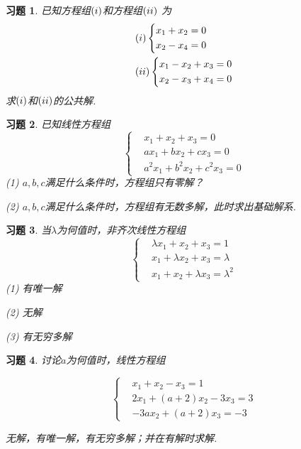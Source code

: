 \documentclass[a4paper]{book}
\newtheorem{ex}{习题}[chapter]
\begin{document}
\begin{ex}\label{5.16}
已知方程组$(\romannumeral 1)$和方程组$(\romannumeral 2)$ 为
\begin{displaymath}\begin{aligned}&
(\romannumeral 1)\left\{ \begin{aligned}&x_1+x_2=0\\&x_2-x_4=0\end{aligned}\right.\\ &
(\romannumeral 2)\left\{ \begin{aligned}&x_1-x_2+x_3=0\\&x_2-x_3+x_4=0\end{aligned}\right.\end{aligned}
\end{displaymath}
求$(\romannumeral 1)$和$(\romannumeral 2)$的公共解.
\end{ex}

\begin{ex}\label{5.17}
已知线性方程组
\begin{displaymath}\left\{\begin{aligned}&x_1+ x_2+ x_3=0\\&ax_1+bx_2+cx_3=0\\&a^2 x_1+b^2 x_2+c^2 x_3=0\end{aligned}\right.\end{displaymath}
(1) $a,b,c$满足什么条件时，方程组只有零解？

(2)  $a,b,c$满足什么条件时，方程组有无数多解，此时求出基础解系.
\end{ex}

\begin{ex}\label{5.18}
当$\lambda$为何值时，非齐次线性方程组
\begin{displaymath}\left\{\begin{aligned}&
\lambda x_1+ x_2+ x_3=1\\& x_1+\lambda x_2+ x_3=\lambda \\& x_1+ x_2+\lambda x_3=\lambda ^2
\end{aligned}\right.\end{displaymath}
(1) 有唯一解

(2) 无解

(3) 有无穷多解
\end{ex}

\begin{ex}\label{5.19}
讨论$a$为何值时，线性方程组

\begin{displaymath}\left\{\begin{aligned}&
x_1+x_2-x_3=1\\&2x_1+(a+2) x_2-3x_3=3\\&-3ax_2+(a+2) x_3=-3
\end{aligned}\right.\end{displaymath}

无解，有唯一解，有无穷多解；并在有解时求解.
\end{ex}
\end{document}
